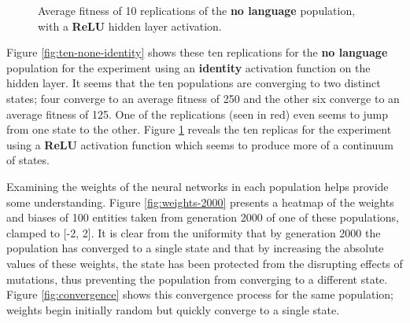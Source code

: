 \documentclass[12pt,a4paper,twoside,openright]{report}
\begin{document}
\begin{figure}[t]
\begin{minipage}{0.49\textwidth}
          \caption{Average fitness of 10 replications of the {\bf no language} population, with a {\bf ReLU} hidden layer activation.}
          \label{fig:ten-none-relu}
   \end{minipage}
\end{figure}

Figure \ref{fig:ten-none-identity} shows these ten replications for the {\bf no language} population for the experiment using an {\bf identity} activation function on the hidden layer. It seems that the ten populations are converging to two distinct states; four converge to an average fitness of 250 and the other six converge to an average fitness of 125. One of the replications (seen in red) even seems to jump from one state to the other. Figure \ref{fig:ten-none-relu} reveals the ten replicas for the experiment using a {\bf ReLU} activation function which seems to produce more of a continuum of states.

Examining the weights of the neural networks in each population helps provide some understanding. Figure \ref{fig:weights-2000} presents a heatmap of the weights and biases of 100 entities taken from generation 2000 of one of these populations, clamped to [-2, 2]. It is clear from the uniformity that by generation 2000 the population has converged to a single state and that by increasing the absolute values of these weights, the state has been protected from the disrupting effects of mutations, thus preventing the population from converging to a different state. Figure \ref{fig:convergence} shows this convergence process for the same population; weights begin initially random but quickly converge to a single state.
\end{document}
